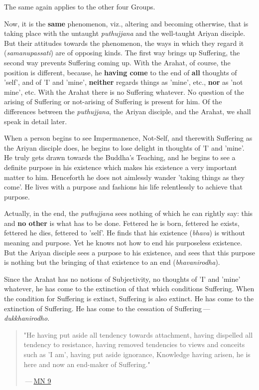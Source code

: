 The same again applies to the other four Groups.


Now, it is the \textbf{same} phenomenon, viz., altering and becoming otherwise,
that is taking place with the untaught \emph{puthujjana} and the well-taught
Ariyan disciple. But their attitudes towards the phenomenon, the ways in
which they regard it (\emph{samanupassati}) are of opposing kinds. The
first way brings up Suffering, the second way prevents Suffering coming
up. With the Arahat, of course, the position is different, because, he
\textbf{having come} to the end of \textbf{all} thoughts of 'self', and of 'I' and
'mine', \textbf{neither} regards things as 'mine', etc., \textbf{nor} as 'not mine',
etc. With the Arahat there is no Suffering whatever. No question of the
arising of Suffering or not-arising of Suffering is present for him. Of
the differences between the \emph{puthujjana}, the Ariyan disciple, and the
Arahat, we shall speak in detail later.


When a person begins to see Impermanence, Not-Self, and therewith
Suffering as the Ariyan disciple does, he begins to lose delight in
thoughts of 'I' and 'mine'. He truly gets drawn towards the Buddha’s
Teaching, and he begins to see a definite purpose in his existence which
makes his existence a very important matter to him. Henceforth he does
not aimlessly wander 'taking things as they come'. He lives with a
purpose and fashions his life relentlessly to achieve that purpose.


Actually, in the end, the \emph{puthujjana} sees nothing of which he can
rightly say: this and \textbf{no other} is what has to be done. Fettered he is
born, fettered he exists, fettered he dies, fettered to 'self'. He finds
that his existence (\emph{bhava}) is without meaning and purpose. Yet he
knows not how to end his purposeless existence. But the Ariyan disciple
sees a purpose to his existence, and sees that this purpose is nothing
but the bringing of that existence to an end (\emph{bhavanirodha}).


Since the Arahat has no notions of Subjectivity, no thoughts of 'I' and
'mine' whatever, he has come to the extinction of that which conditions
Suffering. When the condition for Suffering is extinct, Suffering is
also extinct. He has come to the extinction of Suffering. He has come to
the cessation of Suffering — \emph{dukkhanirodho}.


\begin{quotation}
"He having put aside
all tendency towards attachment, having dispelled all tendency to
resistance, having removed tendencies to views and conceits such as 'I
am', having put aside ignorance, Knowledge having arisen, he is here and
now an end-maker of Suffering."


 — \href{https://suttacentral.net/mn9/en/bodhi}{MN 9}


\end{quotation}

